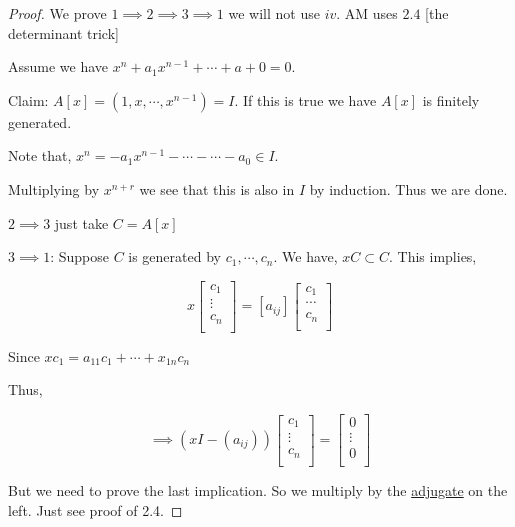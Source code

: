\documentclass{article}
\theoremstyle{definition}
\begin{document}
\begin{proof}
    We prove \(1 \implies 2 \implies 3 \implies 1\) we will not use \(iv\). AM uses \(2.4\) [the determinant trick]

    Assume we have \(x^n + a_1 x^{n-1} + \cdots + a+0 = 0\).
    
    Claim: \(A[x]=(1,x,\cdots,x^{n-1})=I\). If this is true we have \(A[x]\) is finitely generated.

    Note that, \(x^n = -a_1 x^{n-1} - \cdots - \cdots - a_0\in I\).

    Multiplying by \(x^{n+r}\) we see that this is also in \(I\) by induction. Thus we are done.

    \(2 \implies 3\) just take \(C = A[x]\) 
    
    \(3 \implies 1\): Suppose \(C\) is generated by \(c_1,\cdots,c_n\). We have, \(xC \subset C\). This implies,

    \[
        x \begin{bmatrix}
             c_1 \\
             \vdots \\
             c_n \\
        \end{bmatrix} = [a_{ij}] \begin{bmatrix}
             c_1 \\
             \cdots \\
             c_n \\
        \end{bmatrix}
    \]

    Since \(xc_1 = a_{1 1} c_1 +\cdots + x_{1 n}c_n\) 

    Thus,

    \[
        \implies  (xI - (a_{i j})) \begin{bmatrix}
             c_1 \\
             \vdots \\
             c_n \\
        \end{bmatrix} = \begin{bmatrix}
             0 \\
             \vdots \\
             0 \\
        \end{bmatrix}
    \]

    But we need to prove the last implication. So we multiply by the \underline{adjugate} on the left. Just see proof of 2.4.


\end{proof}
\end{document}
